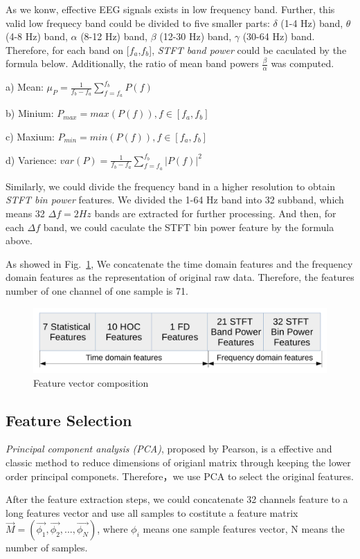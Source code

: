 \documentclass[runningheads,a4paper]{llncs}
\begin{document}
As we konw, effective EEG signals exists in low frequency band.
Further, this valid low frequecy band could be divided to five smaller parts:
$\delta$ (1-4 Hz) band, $\theta$ (4-8 Hz) band, $\alpha$ (8-12 Hz) band,
$\beta$ (12-30 Hz) band, $\gamma$ (30-64 Hz) band.
Therefore, for each band on [$f_a$,$f_b$],
\emph{STFT band power} could be caculated by the formula below. Additionally,
the ratio of mean band powers $\frac{\beta}{\alpha}$ was computed.

a) Mean: $\mu_P = \frac{1}{f_b-f_a}\sum_{f=f_a}^{f_b}P(f)$

b) Minium: $P_{max} = max(P(f)), f\in[f_a,f_b]$

c) Maxium: $P_{min} = min(P(f)), f\in[f_a,f_b]$

d) Varience: $ var(P) = \frac{1}{f_b-f_a}\sum_{f=f_a}^{f_b}|P(f)|^2$

Similarly, we could divide the frequency band in a higher resolution to obtain
\emph{STFT bin power} features. We divided the 1-64 Hz band into 32 subband, which
means 32 $\Delta f = 2Hz$ bands are extracted for further processing.
And then, for each $\Delta f$ band, we could caculate the STFT bin power
feature by the formula above.

As showed in Fig.~\ref{longfeature},
We concatenate the time domain features and the frequency domain features as
the representation of original raw data. Therefore, the features number of one channel of
one sample is 71.

\begin{figure}
  \centering
  \includegraphics[height=2.5cm]{images/15}
  \caption{Feature vector composition}
  \label{longfeature}
\end{figure}

\subsection{Feature Selection}
\emph{Principal component analysis (PCA)}, proposed by Pearson\cite{PCA},
is a effective and classic method to reduce dimensions of origianl
matrix through keeping the lower order principal componets. Therefore，we use PCA to
select the original features.

After the feature extraction steps, we could concatenate 32 channels feature to
a long features vector and use all samples to costitute a feature matrix
$\vec{M} = (\vec{\phi_1}, \vec{\phi_2},..., \vec{\phi_N})$, where $\phi_i$ means
one sample features vector, N means the number of samples.
\end{document}
